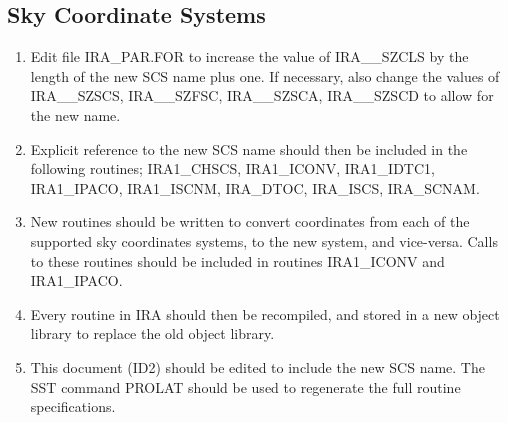 \subsection {Sky Coordinate Systems}
\begin {enumerate}

\item Edit file IRA\_PAR.FOR to increase the value of IRA\_\_SZCLS by the
length of the new SCS name plus one. If necessary, also change the values of
IRA\_\_SZSCS, IRA\_\_SZFSC, IRA\_\_SZSCA, IRA\_\_SZSCD to allow for the new
name.

\item Explicit reference to the new SCS name should then be included in the
following routines; IRA1\_CHSCS, IRA1\_ICONV, IRA1\_IDTC1, IRA1\_IPACO,
IRA1\_ISCNM, IRA\_DTOC, IRA\_ISCS, IRA\_SCNAM.

\item New routines should be written to convert coordinates from each of the
supported sky coordinates systems, to the new system, and vice-versa. Calls
to these routines should be included in routines IRA1\_ICONV and IRA1\_IPACO.

\item Every routine in IRA should then be recompiled, and stored in a new object
library to replace the old object library.

\item This document (ID2) should be edited to include the new SCS name. The
SST command PROLAT should be used to regenerate the full routine specifications.

\end {enumerate}

